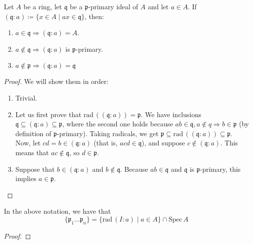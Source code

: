 \begin{lemma}
    Let $A$ be a ring, let $\mathfrak{q}$ be a $\mathfrak{p}$-primary ideal of $A$ and let $a \in A$.
    If \linebreak ${(\mathfrak{q} : a) \coloneqq \{x \in A \mid ax \in \mathfrak{q}\}}$,
    then:

    \begin{enumerate}
        \item $a \in \mathfrak{q} \Rightarrow (\mathfrak{q} : a) = A$.
        \item $a \notin \mathfrak{q} \Rightarrow (\mathfrak{q} : a)$ is $\mathfrak{p}$-primary.
        \item $a \notin \mathfrak{p} \Rightarrow (\mathfrak{q} : a) = \mathfrak{q}$
    \end{enumerate}

    \begin{proof}
        We will show them in order:
        \begin{enumerate}

            \item
            Trivial.

            \item
            Let us first prove that $\text{rad}\,((\mathfrak{q} : a)) = \mathfrak{p}$.
            We have inclusions $\mathfrak{q} \subseteq (\mathfrak{q} : a) \subseteq \mathfrak{p}$,
            where the second one holds because $ab \in \mathfrak{q}, a \notin q \Rightarrow b \in \mathfrak{p}$ (by definition of $\mathfrak{p}$-primary).
            Taking radicals, we get $\mathfrak{p} \subseteq \text{rad}\,((\mathfrak{q} : a)) \subseteq \mathfrak{p}$.
            Now, let $cd = b \in (\mathfrak{q} : a)$ (that is, $acd \in \mathfrak{q}$),
            and suppose $c \notin (\mathfrak{q} : a)$.
            This means that $ac \notin \mathfrak{q}$, so $d \in \mathfrak{p}$.

            \item
            Suppose that $b \in (\mathfrak{q} : a)$ and $b \notin \mathfrak{q}$.
            Because $ab \in \mathfrak{q}$ and $\mathfrak{q}$ is $\mathfrak{p}$-primary,
            this implies $a \in \mathfrak{p}$.

        \end{enumerate}
    \end{proof}
\end{lemma}


\begin{theorem}
    In the above notation, we have that \[\{\mathfrak{p}_1 \ldots \mathfrak{p}_n\} = \{\text{rad}\,(I : a) \mid a \in A\} \cap \text{Spec}\,A\]

    \begin{proof}

    \end{proof}
\end{theorem}